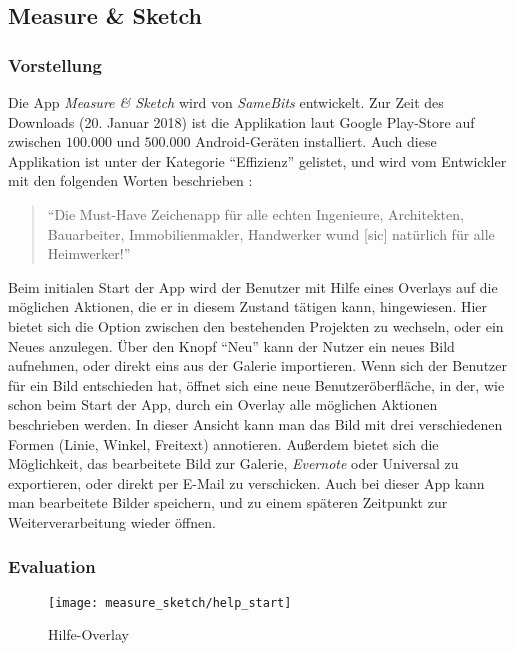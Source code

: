 \subsection{Measure \& Sketch}
\subsubsection{Vorstellung}
Die App \emph{Measure \& Sketch} wird von \emph{SameBits} entwickelt.
Zur Zeit des Downloads (20. Januar 2018) ist die Applikation laut Google Play-Store auf zwischen $100.000$ und $500.000$ Android-Geräten installiert.
Auch diese Applikation ist unter der Kategorie ``Effizienz'' gelistet, und wird vom Entwickler mit den folgenden Worten beschrieben \citep{BitsMS}:

\begin{quote}
  ``Die Must-Have Zeichenapp für alle echten Ingenieure, Architekten, Bauarbeiter, Immobilienmakler, Handwerker wund [sic] natürlich für alle Heimwerker!''
\end{quote}

\noindent
Beim initialen Start der App wird der Benutzer mit Hilfe eines Overlays auf die möglichen Aktionen, die er in diesem Zustand tätigen kann, hingewiesen.
Hier bietet sich die Option zwischen den bestehenden Projekten zu wechseln, oder ein Neues anzulegen.
Über den Knopf ``Neu''  kann der Nutzer ein neues Bild aufnehmen, oder direkt eins aus der Galerie importieren.
Wenn sich der Benutzer für ein Bild entschieden hat, öffnet sich eine neue Benutzeröberfläche, in der, wie schon beim Start der App, durch ein Overlay alle möglichen Aktionen beschrieben werden.
In dieser Ansicht kann man das Bild mit drei verschiedenen Formen (Linie, Winkel, Freitext) annotieren.
Außerdem bietet sich die Möglichkeit, das bearbeitete Bild zur Galerie, \emph{Evernote} oder Universal  zu exportieren, oder direkt per E-Mail zu verschicken.
Auch bei dieser App kann man bearbeitete Bilder speichern, und zu einem späteren Zeitpunkt zur Weiterverarbeitung wieder öffnen. \\

\subsubsection{Evaluation}

\begin{wrapfigure}{R}{0.4\textwidth}
	\texttt{[image: measure\_sketch/help\_start]}
	\caption{Hilfe-Overlay}
	\label{fig:mshelp}
\end{wrapfigure}

